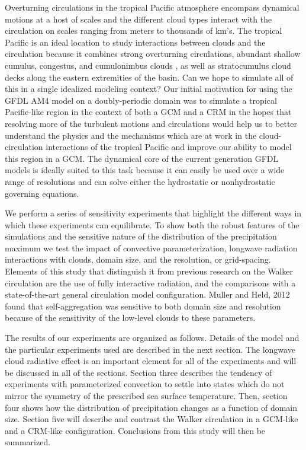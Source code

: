\documentclass[draft]{agujournal2019}
\begin{document}
  Overturning circulations in the tropical Pacific atmosphere encompass dynamical motions at a host of scales 
and the different cloud types interact with the circulation on scales ranging from meters to thousands of km's.  
The tropical Pacific is an ideal location to study interactions between clouds and the circulation 
because it combines strong overturning circulations, abundant shallow cumulus, congestus, and cumulonimbus 
clouds \cite{Johnson1999}, as well as stratocumulus cloud decks along the eastern extremities of the basin.
Can we hope to simulate all of this in a single idealized modeling context?   Our initial motivation for using the 
GFDL AM4 model on a doubly-periodic domain was to simulate a tropical Pacific-like region 
in the context of both a GCM and a CRM in the hopes that resolving more of the turbulent motions and circulations
would help us to better understand the physics and the mechanisms which are at work in the cloud-circulation
interactions of the tropical Pacific and improve our ability to model this region in a GCM.    The dynamical core 
of the current generation GFDL models is ideally suited to this task because it can easily be used over a wide 
range of resolutions and can solve either the hydrostatic or nonhydrostatic governing equations.  

We perform a series of sensitivity experiments that highlight the different ways in which these experiments can equilibrate.  To 
show both the robust features of the simulations and the sensitive nature of the distribution of the precipitation maximum 
we test the impact of convective parameterization, longwave radiation interactions with clouds, domain size, 
and the resolution, or grid-spacing.  Elements of this study that distinguish it from previous research on the Walker 
circulation are the use of fully interactive radiation, and the comparisons with a state-of-the-art general circulation
model configuration.   Muller and Held, 2012 found that self-aggregation was sensitive to both domain 
size and resolution because of the sensitivity of the low-level clouds to these parameters.  %

The results of our experiments are organized as follows.  Details of the model and the particular experiments used are described
in the next section.  The longwave cloud radiative effect is an important element for all of the experiments and will be 
discussed in all of the sections.   
Section three describes the tendency of experiments with parameterized convection to settle into states which 
do not mirror the symmetry of the prescribed sea surface temperature.   
Then, section four shows how the distribution of precipitation changes as a function of domain size.  
Section five will describe and contrast the Walker circulation in a GCM-like and a CRM-like configuration. 
Conclusions from this study will then be summarized.  
\end{document}
